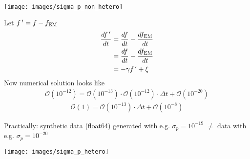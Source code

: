 \documentclass[10pt]{beamer}
\begin{document}
\begin{frame}{}
	\texttt{[image: images/sigma\_p\_non\_hetero]}
	
	
\end{frame}


\begin{frame}{}
	Let $f \, ' = f - f_{\rm EM}$
	\begin{align}
		\frac{df \, '}{dt}&= \frac{df}{dt} - \frac{df_{\rm EM}}{dt} \\
		                    &= \frac{df}{dt} - \frac{df_{\rm EM}}{dt} \\
		                    &= - \gamma f \, '  + \xi 
	\end{align}
	Now numerical solution looks like
	\begin{eqnarray}
				\mathcal{O}(10^{-12}) = \mathcal{O}(10^{-13}) \cdot \mathcal{O}(10^{-12}) \cdot \Delta t  + \mathcal{O}(10^{-20})
	\end{eqnarray}
	\begin{eqnarray}
	\mathcal{O}(1) = \mathcal{O}(10^{-13}) \cdot \Delta t  + \mathcal{O}(10^{-8})
\end{eqnarray}


	
	Practically: synthetic data (float64) generated with e.g. $\sigma_p = 10^{-19}$ $\neq$ data with e.g. $\sigma_p = 10^{-20}$ 
	
	
\end{frame}

\begin{frame}{}
	\texttt{[image: images/sigma\_p\_hetero]}
	
\end{frame}
\end{document}
